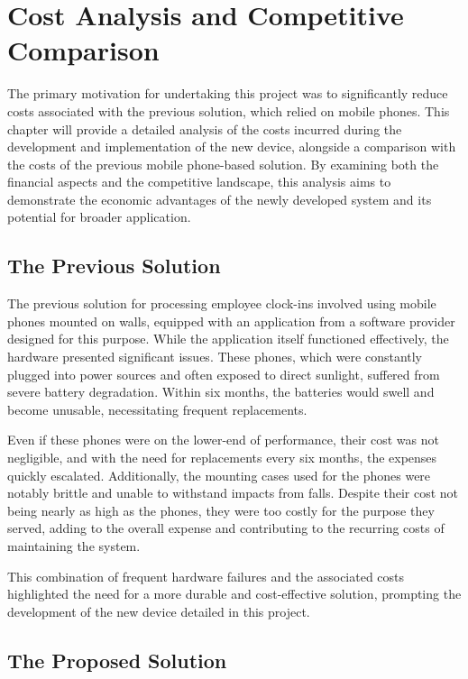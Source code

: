 \chapter{Cost Analysis and Competitive Comparison}
\label{cap:costAndCompetitiveAnalysis}

The primary motivation for undertaking this project was to significantly reduce costs associated 
with the previous solution, which relied on mobile phones. This chapter will provide a detailed 
analysis of the costs incurred during the development and implementation of the new device, 
alongside a comparison with the costs of the previous mobile phone-based solution. By examining 
both the financial aspects and the competitive landscape, this analysis aims to demonstrate the 
economic advantages of the newly developed system and its potential for broader application.

\section{The Previous Solution}

The previous solution for processing employee clock-ins involved using mobile phones mounted on 
walls, equipped with an application from a software provider designed for this purpose. While the 
application itself functioned effectively, the hardware presented significant issues. These 
phones, which were constantly plugged into power sources and often exposed to direct sunlight, 
suffered from severe battery degradation. Within six months, the batteries would swell and become 
unusable, necessitating frequent replacements.

Even if these phones were on the lower-end of performance, their cost was not negligible, and with 
the need for replacements every six months, the expenses quickly escalated. Additionally, the 
mounting cases used for the phones were notably brittle and unable to withstand impacts from 
falls. Despite their cost not being nearly as high as the phones, they were too costly for the 
purpose they served, adding to the overall expense and contributing to the recurring costs of 
maintaining the system.

This combination of frequent hardware failures and the associated costs highlighted the need for a 
more durable and cost-effective solution, prompting the development of the new device detailed in 
this project.

\section{The Proposed Solution}

